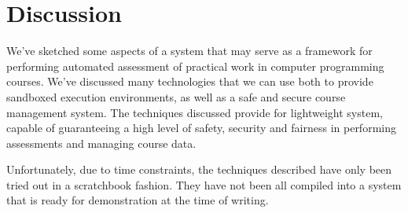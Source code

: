
\chapter{Discussion}

\label{section:discussion}

We've sketched some aspects of a system that may serve as a framework for
performing automated assessment of practical work in computer programming
courses. We've discussed many technologies that we can use both to provide
sandboxed execution environments, as well as a safe and secure course
management system. The techniques discussed provide for lightweight system,
capable of guaranteeing a high level of safety, security and fairness in
performing assessments and managing course data.

Unfortunately, due to time constraints, the techniques described have only been
tried out in a scratchbook fashion. They have not been all compiled into a
system that is ready for demonstration at the time of writing.













